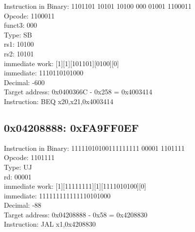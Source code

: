 \documentclass{article}
\begin{document}
Instruction in Binary: 1101101 10101 10100 000 01001 1100011\\
Opcode: 1100011\\
funct3: 000\\
Type: SB\\
rs1: 10100\\
rs2: 10101\\
immediate work: [1][1][101101][0100][0]\\
immediate: 1110110101000\\
Decimal: -600\\
Target address: 0x0400366C - 0x258 = 0x4003414\\
Instruction: BEQ x20,x21,0x4003414\\

\subsection*{0x04208888: 0xFA9FF0EF}

Instruction in Binary: 11111010100111111111 00001 1101111\\
Opcode: 1101111\\
Type: UJ\\
rd: 00001\\
immediate work: [1][11111111][1][1111010100][0]\\
immediate: 111111111111110101000\\
Decimal: -88\\
Target address: 0x04208888 - 0x58 = 0x4208830\\
Instruction: JAL x1,0x4208830\\
\end{document}
